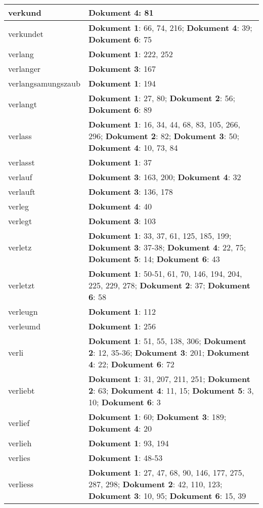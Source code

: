\documentclass[a5paper]{article}
\begin{document}
\begin{longtable}[l]{|l|p{3in}|}
verkund & \textbf{Dokument 4}: 81 \\
\hline
verkundet & \textbf{Dokument 1}: 66, 74, 216; \textbf{Dokument 4}: 39; \textbf{Dokument 6}: 75 \\
\hline
verlang & \textbf{Dokument 1}: 222, 252 \\
\hline
verlanger & \textbf{Dokument 3}: 167 \\
\hline
verlangsamungszaub & \textbf{Dokument 1}: 194 \\
\hline
verlangt & \textbf{Dokument 1}: 27, 80; \textbf{Dokument 2}: 56; \textbf{Dokument 6}: 89 \\
\hline
verlass & \textbf{Dokument 1}: 16, 34, 44, 68, 83, 105, 266, 296; \textbf{Dokument 2}: 82; \textbf{Dokument 3}: 50; \textbf{Dokument 4}: 10, 73, 84 \\
\hline
verlasst & \textbf{Dokument 1}: 37 \\
\hline
verlauf & \textbf{Dokument 3}: 163, 200; \textbf{Dokument 4}: 32 \\
\hline
verlauft & \textbf{Dokument 3}: 136, 178 \\
\hline
verleg & \textbf{Dokument 4}: 40 \\
\hline
verlegt & \textbf{Dokument 3}: 103 \\
\hline
verletz & \textbf{Dokument 1}: 33, 37, 61, 125, 185, 199; \textbf{Dokument 3}: 37-38; \textbf{Dokument 4}: 22, 75; \textbf{Dokument 5}: 14; \textbf{Dokument 6}: 43 \\
\hline
verletzt & \textbf{Dokument 1}: 50-51, 61, 70, 146, 194, 204, 225, 229, 278; \textbf{Dokument 2}: 37; \textbf{Dokument 6}: 58 \\
\hline
verleugn & \textbf{Dokument 1}: 112 \\
\hline
verleumd & \textbf{Dokument 1}: 256 \\
\hline
verli & \textbf{Dokument 1}: 51, 55, 138, 306; \textbf{Dokument 2}: 12, 35-36; \textbf{Dokument 3}: 201; \textbf{Dokument 4}: 22; \textbf{Dokument 6}: 72 \\
\hline
verliebt & \textbf{Dokument 1}: 31, 207, 211, 251; \textbf{Dokument 2}: 63; \textbf{Dokument 4}: 11, 15; \textbf{Dokument 5}: 3, 10; \textbf{Dokument 6}: 3 \\
\hline
verlief & \textbf{Dokument 1}: 60; \textbf{Dokument 3}: 189; \textbf{Dokument 4}: 20 \\
\hline
verlieh & \textbf{Dokument 1}: 93, 194 \\
\hline
verlies & \textbf{Dokument 1}: 48-53 \\
\hline
verliess & \textbf{Dokument 1}: 27, 47, 68, 90, 146, 177, 275, 287, 298; \textbf{Dokument 2}: 42, 110, 123; \textbf{Dokument 3}: 10, 95; \textbf{Dokument 6}: 15, 39 \\

\end{longtable}
\end{document}

